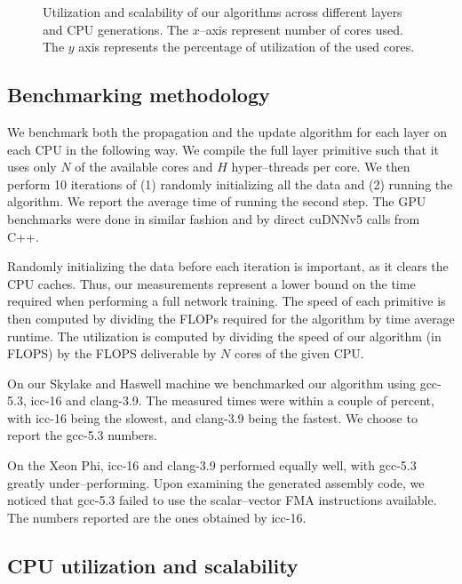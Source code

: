 \begin{figure}
\begin{tabular}{ >{\centering\arraybackslash}c ccccccl }
    \end{tabular}
    \caption{Utilization and scalability of our algorithms across
      different layers and CPU generations.  The $x$--axis represent
      number of cores used.  The $y$ axis represents the percentage of
      utilization of the used cores.}
    \label{fig:scalability}
  \end{figure}

  \subsection{Benchmarking methodology}

  We benchmark both the propagation and the update algorithm for each
  layer on each CPU in the following way.  We compile the full layer
  primitive such that it uses only $N$ of the available cores and $H$
  hyper--threads per core.  We then perform 10 iterations of (1)
  randomly initializing all the data and (2) running the algorithm.
  We report the average time of running the second step.  The GPU
  benchmarks were done in similar fashion and by direct cuDNNv5 calls
  from C++.

  Randomly initializing the data before each iteration is important,
  as it clears the CPU caches.  Thus, our measurements represent a
  lower bound on the time required when performing a full network
  training.  The speed of each primitive is then computed by dividing
  the FLOPs required for the algorithm by time average runtime.  The
  utilization is computed by dividing the speed of our algorithm (in
  FLOPS) by the FLOPS deliverable by $N$ cores of the given CPU.

  On our Skylake and Haswell machine we benchmarked our algorithm
  using gcc-5.3, icc-16 and clang-3.9.  The measured times were within
  a couple of percent, with icc-16 being the slowest, and clang-3.9
  being the fastest.  We choose to report the gcc-5.3 numbers.

  On the Xeon Phi, icc-16 and clang-3.9 performed equally well, with
  gcc-5.3 greatly under--performing.  Upon examining the generated
  assembly code, we noticed that gcc-5.3 failed to use the
  scalar--vector FMA instructions available.  The numbers reported are
  the ones obtained by icc-16.

  \subsection{CPU utilization and scalability}

